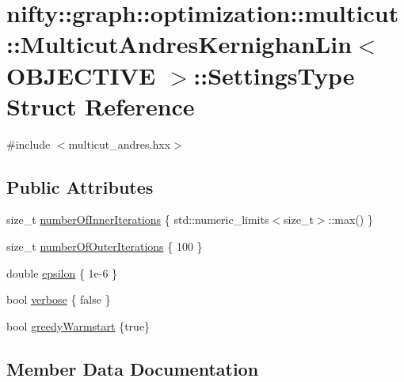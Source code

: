 \hypertarget{structnifty_1_1graph_1_1optimization_1_1multicut_1_1MulticutAndresKernighanLin_1_1SettingsType}{}\section{nifty\+:\+:graph\+:\+:optimization\+:\+:multicut\+:\+:Multicut\+Andres\+Kernighan\+Lin$<$ O\+B\+J\+E\+C\+T\+I\+V\+E $>$\+:\+:Settings\+Type Struct Reference}
\label{structnifty_1_1graph_1_1optimization_1_1multicut_1_1MulticutAndresKernighanLin_1_1SettingsType}


{\ttfamily \#include $<$multicut\+\_\+andres.\+hxx$>$}

\subsection*{Public Attributes}
\begin{DoxyCompactItemize}
\item 
size\+\_\+t \hyperlink{structnifty_1_1graph_1_1optimization_1_1multicut_1_1MulticutAndresKernighanLin_1_1SettingsType_a7f8372e73c3efb9307299428cc546128}{number\+Of\+Inner\+Iterations} \{ std\+::numeric\+\_\+limits$<$size\+\_\+t$>$\+::max() \}
\item 
size\+\_\+t \hyperlink{structnifty_1_1graph_1_1optimization_1_1multicut_1_1MulticutAndresKernighanLin_1_1SettingsType_a04fd536ef01d3902d2f1c362ed34e6b2}{number\+Of\+Outer\+Iterations} \{ 100 \}
\item 
double \hyperlink{structnifty_1_1graph_1_1optimization_1_1multicut_1_1MulticutAndresKernighanLin_1_1SettingsType_a1a055189e7d6171a35312506c3b53386}{epsilon} \{ 1e-\/6 \}
\item 
bool \hyperlink{structnifty_1_1graph_1_1optimization_1_1multicut_1_1MulticutAndresKernighanLin_1_1SettingsType_acec3bd5b7686a64cef0b24d403ad2b8a}{verbose} \{ false \}
\item 
bool \hyperlink{structnifty_1_1graph_1_1optimization_1_1multicut_1_1MulticutAndresKernighanLin_1_1SettingsType_a2043a045913c6e562308c0bff179f86c}{greedy\+Warmstart} \{true\}
\end{DoxyCompactItemize}


\subsection{Member Data Documentation}
\hypertarget{structnifty_1_1graph_1_1optimization_1_1multicut_1_1MulticutAndresKernighanLin_1_1SettingsType_a1a055189e7d6171a35312506c3b53386}{}
